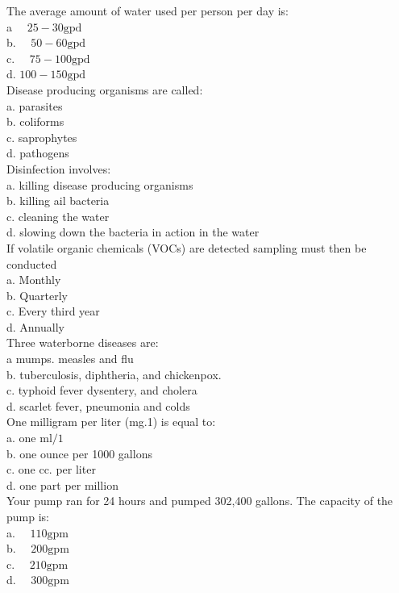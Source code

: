 The average amount of water used per person per day is:\\
a $\quad 25-30 \mathrm{gpd}$\\
b. $\quad 50-60 \mathrm{gpd}$\\
c. $\quad 75-100 \mathrm{gpd}$\\
d. $100-150 \mathrm{gpd}$\\

Disease producing organisms are called:\\
a. parasites\\
b. coliforms\\
c. saprophytes\\
d. pathogens\\

Disinfection involves:\\
a. killing disease producing organisms\\
b. killing ail bacteria\\
c. cleaning the water\\
d. slowing down the bacteria in action in the water\\

If volatile organic chemicals (VOCs) are detected sampling must then be conducted\\
a. Monthly\\
b. Quarterly\\
c. Every third year\\
d. Annually\\

Three waterborne diseases are:\\
a mumps. measles and flu\\
b. tuberculosis, diphtheria, and chickenpox.\\
c. typhoid fever dysentery, and cholera\\
d. scarlet fever, pneumonia and colds \\

One milligram per liter (mg.1) is equal to:\\
a. one $\mathrm{ml} / 1$\\
b. one ounce per 1000 gallons\\
c. one cc. per liter\\
d. one part per million\\

Your pump ran for 24 hours and pumped 302,400 gallons. The capacity of the pump is:\\
a. $\quad 110 \mathrm{gpm}$\\
b. $\quad 200 \mathrm{gpm}$\\
c. $\quad 210 \mathrm{gpm}$\\
d. $\quad 300 \mathrm{gpm}$\\


